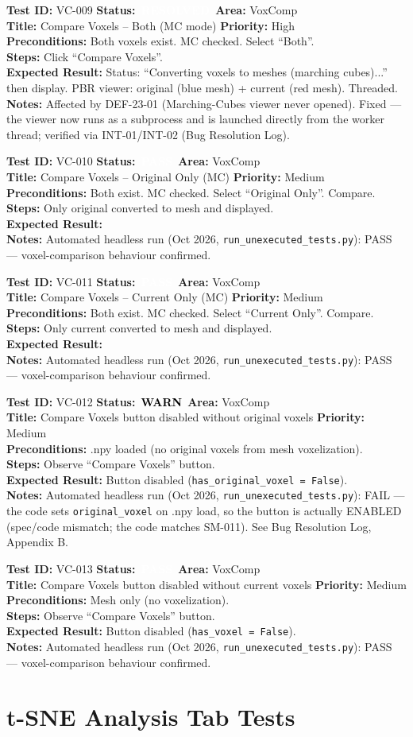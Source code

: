 \documentclass[12pt,a4paper]{article}
\newcommand{\statuspass}{\colorbox{statusgreen}{\textcolor{white}{\textbf{\,PASS\,}}}}
\newcommand{\statuswarn}{\colorbox{statusyellow}{\textcolor{black}{\textbf{\,WARN\,}}}}
\newcommand{\statusresolved}{\colorbox{statusorange}{\textcolor{white}{\textbf{\,RESOLVED\,}}}}
\newcommand{\testcase}[9]{%
  \smallskip
  \noindent\textbf{Test ID:} #1 \hfill \textbf{Status:} #2 \hfill \textbf{Area:} #3 \\
  \textbf{Title:} #4 \hfill \textbf{Priority:} #5 \\[0.3em]
  \textbf{Preconditions:} #6 \\[0.3em]
  \textbf{Steps:} #7 \\[0.3em]
  \textbf{Expected Result:} #8 \\
  \textbf{Notes:} #9
  \smallskip
}
\begin{document}
\testcase{VC-009}{\statusresolved}{VoxComp}{Compare Voxels -- Both (MC mode)}{High}{Both voxels exist. MC checked. Select ``Both''.}{Click ``Compare Voxels''.}{Status: ``Converting voxels to meshes (marching cubes)...'' then display. PBR viewer: original (blue mesh) + current (red mesh). Threaded.}{Affected by DEF-23-01 (Marching-Cubes viewer never opened). Fixed --- the viewer now runs as a subprocess and is launched directly from the worker thread; verified via INT-01/INT-02 (Bug Resolution Log).}


\testcase{VC-010}{\statuspass}{VoxComp}{Compare Voxels -- Original Only (MC)}{Medium}{Both exist. MC checked. Select ``Original Only''. Compare.}{Only original converted to mesh and displayed.}{}{Automated headless run (Oct 2026, \texttt{run\_unexecuted\_tests.py}): PASS --- voxel-comparison behaviour confirmed.}


\testcase{VC-011}{\statuspass}{VoxComp}{Compare Voxels -- Current Only (MC)}{Medium}{Both exist. MC checked. Select ``Current Only''. Compare.}{Only current converted to mesh and displayed.}{}{Automated headless run (Oct 2026, \texttt{run\_unexecuted\_tests.py}): PASS --- voxel-comparison behaviour confirmed.}


\testcase{VC-012}{\statuswarn}{VoxComp}{Compare Voxels button disabled without original voxels}{Medium}{.npy loaded (no original voxels from mesh voxelization).}{Observe ``Compare Voxels'' button.}{Button disabled (\texttt{has\_original\_voxel = False}).}{Automated headless run (Oct 2026, \texttt{run\_unexecuted\_tests.py}): FAIL --- the code sets \texttt{original\_voxel} on .npy load, so the button is actually ENABLED (spec/code mismatch; the code matches SM-011). See Bug Resolution Log, Appendix B.}


\testcase{VC-013}{\statuspass}{VoxComp}{Compare Voxels button disabled without current voxels}{Medium}{Mesh only (no voxelization).}{Observe ``Compare Voxels'' button.}{Button disabled (\texttt{has\_voxel = False}).}{Automated headless run (Oct 2026, \texttt{run\_unexecuted\_tests.py}): PASS --- voxel-comparison behaviour confirmed.}



\section{t-SNE Analysis Tab Tests}
\end{document}
